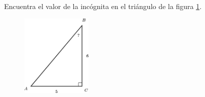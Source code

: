 Encuentra el valor de la incógnita en el triángulo de la figura \ref{fig:angle_functrig_24}.
\begin{figure}[H]
    \begin{center}
        \includegraphics[width=0.3\textwidth]{../images/angle_functrig_24.png}
    \end{center}
    \caption{}
    \label{fig:angle_functrig_24}
\end{figure}